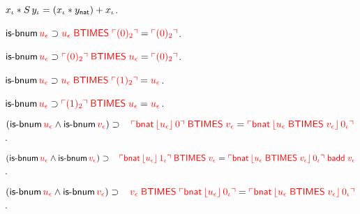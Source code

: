 \begin{biformthy}
    \item $x_\iota * S \, y_\iota = (x_\iota * y_{\sf
      nat}) + x_\iota$.

    \item $\mbox{\sf is-bnum} \, \textcolor{red}{u_\epsilon} \supset
      \textcolor{red}{u_\epsilon \; \mbox{\sf BTIMES} \; \ulcorner(0)_2\urcorner} =
      \textcolor{red}{\ulcorner(0)_2\urcorner}$.

    \item $\mbox{\sf is-bnum} \, \textcolor{red}{u_\epsilon} \supset \textcolor{red}{
      \ulcorner(0)_2\urcorner \; \mbox{\sf BTIMES} \; u_\epsilon} =
      \textcolor{red}{\ulcorner(0)_2\urcorner}$.

    \item $\mbox{\sf is-bnum} \, \textcolor{red}{u_\epsilon} \supset
      \textcolor{red}{u_\epsilon \; \mbox{\sf BTIMES} \; \ulcorner(1)_2\urcorner} =
      \textcolor{red}{u_\epsilon}$.

    \item $\mbox{\sf is-bnum} \, \textcolor{red}{u_\epsilon} \supset
      \textcolor{red}{\ulcorner(1)_2\urcorner \; \mbox{\sf BTIMES} \; u_\epsilon} =
      \textcolor{red}{u_\epsilon}$.

    \item $(\mbox{\sf is-bnum} \, \textcolor{red}{u_\epsilon} \wedge \mbox{\sf is-bnum}
      \, \textcolor{red}{v_\epsilon}) \supset {}\\
        \hspace*{2ex} \textcolor{red}{\ulcorner\mbox{\sf bnat} \,
            \lfloor u_\epsilon\rfloor \, 0\urcorner \; \mbox{\sf BTIMES} \;
          \textcolor{red}{v_\epsilon}} = \textcolor{red}{\ulcorner\mbox{\sf bnat} \,
            \lfloor u_\epsilon \; \mbox{\sf BTIMES} \; v_\epsilon\rfloor \,
            0_\iota\urcorner}$.

    \item $(\mbox{\sf is-bnum} \, \textcolor{red}{u_\epsilon} \wedge \mbox{\sf is-bnum}
      \, \textcolor{red}{v_\epsilon}) \supset {}\\
        \hspace*{2ex} \textcolor{red}{\ulcorner\mbox{\sf bnat} \,
            \lfloor u_\epsilon\rfloor \, 1_\iota\urcorner \; \mbox{\sf BTIMES} \;
          \textcolor{red}{v_\epsilon}} = \textcolor{red}{\ulcorner\mbox{\sf bnat} \,
            \lfloor u_\epsilon \; \mbox{\sf BTIMES} \; v_\epsilon\rfloor \,
            0_\iota\urcorner \; \mbox{\sf badd} \; v_\epsilon}$.

    \item $(\mbox{\sf is-bnum} \, \textcolor{red}{u_\epsilon} \wedge \mbox{\sf is-bnum}
      \, \textcolor{red}{v_\epsilon}) \supset {}\\
        \hspace*{2ex} \textcolor{red}{\textcolor{red}{v_\epsilon}\; \mbox{\sf BTIMES} \;
          \ulcorner\mbox{\sf bnat} \, \lfloor u_\epsilon\rfloor \, 0_\iota\urcorner} =
        \textcolor{red}{\ulcorner\mbox{\sf bnat} \, \lfloor u_\epsilon \;
              \mbox{\sf BTIMES} \; v_\epsilon\rfloor \, 0_\iota\urcorner}$.


\end{biformthy}
